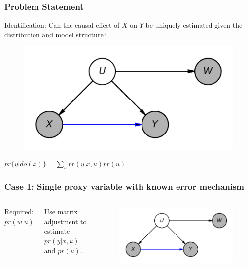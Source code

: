 \documentclass{beamer}
\begin{document}
\begin{frame}
\frametitle{Problem Statement}

\begin{center}
Identification: Can the causal effect of $ X $ on $ Y $ be uniquely estimated given the distribution and model structure?
\end{center}

\begin{figure}
    \centering
    \includegraphics[scale=0.6]{scripts/single_proxy.png}
    \label{fig:non_iden}
\end{figure}

\begin{center}
	$ pr\{y | do(x)\} = \sum_{u} pr(y | x, u) pr(u) $ 
\end{center}
\end{frame}

\begin{frame}
\frametitle{Case 1: Single proxy variable with known error mechanism}

\begin{columns}
	Required: $ pr(w | u) $
	
	\bigskip

	Use matrix adjustment to estimate $ pr(y | x, u) $ and $ pr(u) $.


    \begin{figure}
    	\centering
    	\includegraphics[scale=0.6]{scripts/single_proxy.png}
    \end{figure}

\end{columns}

\end{frame}
\end{document}
